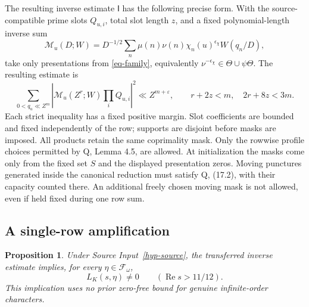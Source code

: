 \documentclass[11pt,a4paper]{article}
\newtheorem{proposition}[theorem]{Proposition}
\theoremstyle{remark}\newtheorem{remark}[theorem]{Remark}
\newcommand{\Rea}{\operatorname{Re}}
\newcommand{\eps}{\varepsilon}
\newcommand{\Packet}{\mathscr F_\omega}
\newcommand{\Mcal}{\mathcal M}
\numberwithin{equation}{section}
\begin{document}
The resulting inverse estimate $\mathsf I$ has the following precise form. With the
source-compatible prime slots $Q_{u,i}$,
total slot length $z$, and a fixed polynomial-length inverse sum
\[
 \Mcal_u(D;W)=D^{-1/2}\sum_n
       \mu(n)\nu(n)\chi_n(u)^{\epsilon_\chi}W(q_n/D),
\]
take only presentations from \eqref{eq-family}, equivalently
$\nu^{-\epsilon_\chi}\in\Theta\cup\psi\Theta$.
The resulting estimate is
\begin{equation}\label{eq-MI}
 \sum_{0<q_u\ll Z^m}
 \left|\Mcal_u(Z^r;W)\prod_iQ_{u,i}\right|^2
 \ll Z^{m+\eps},
 \qquad r+2z<m,\quad 2r+8z<3m.
\end{equation}
Each strict inequality has a fixed positive margin. Slot coefficients
are bounded and fixed independently of the row; supports are
disjoint before masks are imposed. All products retain the same
coprimality mask. Only the rowwise profile choices permitted by Q,
Lemma 4.5, are allowed. At initialization the masks come only from
the fixed set $S$ and the displayed presentation zeros. Moving
punctures generated inside the canonical reduction must satisfy
Q, (17.2), with their capacity counted there. An additional freely
chosen moving mask is not allowed, even if held fixed during one
row sum.

\subsection{A single-row amplification}

\begin{proposition}\label{prop-seed}
Under Source Input~\ref{hyp-source}, the transferred inverse estimate implies,
for every $\eta\in\Packet$,
\begin{equation}\label{eq-seed}
 L_K(s,\eta)\ne0\qquad(\Rea s>11/12).
\end{equation}
This implication uses no prior zero-free bound for genuine
infinite-order characters.
\end{proposition}
\end{document}
